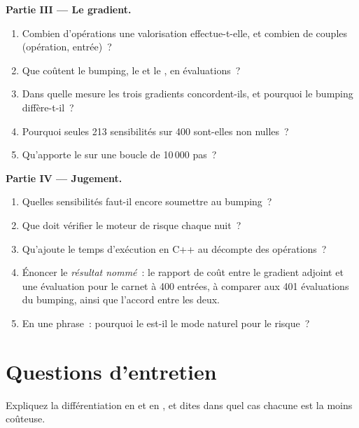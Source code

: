 \begin{problem}
\medskip\noindent\textbf{Partie III --- Le gradient.}
\begin{enumerate}[resume]
\item Combien d'opérations une valorisation effectue-t-elle, et combien de couples (opération, entrée)~?
\item Que coûtent le bumping, le  et le , en évaluations~?
\item Dans quelle mesure les trois gradients concordent-ils, et pourquoi le bumping diffère-t-il~?
\item Pourquoi seules 213 sensibilités sur 400 sont-elles non nulles~?
\item Qu'apporte le  sur une boucle de 10\,000 pas~?
\end{enumerate}

\medskip\noindent\textbf{Partie IV --- Jugement.}
\begin{enumerate}[resume]
\item Quelles sensibilités faut-il encore soumettre au bumping~?
\item Que doit vérifier le moteur de risque chaque nuit~?
\item Qu'ajoute le temps d'exécution en C++ au décompte des opérations~?
\item Énoncer le \emph{résultat nommé}~: le rapport de coût entre le gradient adjoint et une évaluation pour le carnet à 400 entrées, à comparer aux 401 évaluations du bumping, ainsi que l'accord entre les deux.
\item En une phrase~: pourquoi le  est-il le mode naturel pour le risque~?
\end{enumerate}
\end{problem}

\section{Questions d'entretien}

\begin{interviewq}\label{iq:qm:transforms-interpolation-and-algorithmic-differentiation:1}
Expliquez la différentiation en  et en , et dites dans quel cas chacune est la moins coûteuse.
\end{interviewq}

